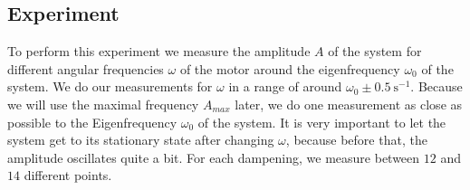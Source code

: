 \subsection{Experiment}
To perform this experiment we measure the amplitude $A$ of the system for different angular frequencies $\omega$ of the motor around the eigenfrequency $\omega_0$ of the system.
We do our measurements for $\omega$ in a range of around $\omega_0 \pm \SI{0.5}{\second^{-1}}$.
Because we will use the maximal frequency $A_{max}$ later, we do one measurement as close as possible to the Eigenfrequency $\omega_0$ of the system.
It is very important to let the system get to its stationary state after changing $\omega$, because before that, the amplitude oscillates quite a bit.
For each dampening, we measure between $12$ and $14$ different points.
